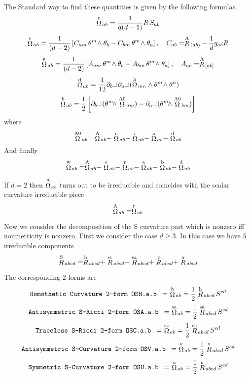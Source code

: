 \documentclass[twoside,openright]{report}
\newcommand{\grgtt}{\ttfamily}
\newcommand{\object}[2]{%
\begin{equation}
\mbox{\comm{#1}} =\ #2
\end{equation}}
\newcommand{\RR}[1]{\stackrel{\rm #1}{R}\!{}}
\newcommand{\OO}[1]{\stackrel{\rm #1}{\Omega}\!{}}
\newcommand{\ipr}{\rule{1.8mm}{.1mm}\rule{.1mm}{2.2mm}\,} %
\renewcommand{\tt}{\grgtt}
\newcommand{\comm}[1]{{\upshape\tt#1}}    %
\begin{document}
The {\tt Standard way} to find these quantities is given
by the following formulas.
\begin{equation}
\OO{r}_{ab} = \frac{1}{d(d-1)}R\,S_{ab}
\end{equation}
\begin{equation}
\OO{c}_{ab} = \frac{1}{(d-2)}\left[
C_{am}\,\theta^m\!\wedge\theta_b
-C_{bm}\,\theta^m\!\wedge\theta_a\right],\quad
C_{ab}=\RR{A}_{(ab)}-\frac{1}{d}g_{ab}R
\end{equation}
\begin{equation}
\OO{a}_{ab} = \frac{1}{(d-2)}\left[
A_{am}\,\theta^m\!\wedge\theta_b
-A_{bm}\,\theta^m\!\wedge\theta_a\right],\quad
A_{ab}=\RR{A}_{[ab]}
\end{equation}
\begin{equation}
\OO{d}_{ab} = \frac{1}{12}\partial_b\ipr\partial_a\ipr
(\OO{A}_{mn}\wedge\theta^m\!\wedge\theta^n)
\end{equation}
\begin{equation}
\OO{b}_{ab} =\frac{1}{2}\left[
\partial_b\ipr(\theta^m\!\wedge\OO{A0}_{am})
-\partial_a\ipr(\theta^m\!\wedge\OO{A0}_{bm})
\right]
\end{equation}
where
\[
\OO{A0}_{ab} =
\OO{A}_{ab}
-\OO{c}_{ab}
-\OO{r}_{ab}
-\OO{a}_{ab}
-\OO{d}_{ab}
\]
And finally
\begin{equation}
\OO{w}_{ab} =
\OO{A}_{ab}
-\OO{c}_{ab}
-\OO{r}_{ab}
-\OO{a}_{ab}
-\OO{b}_{ab}
-\OO{d}_{ab}
\end{equation}

If $d=2$ then $\OO{A}_{ab}$ turns out to be irreducible and
coincides with the scalar curvature irreducible piece
\begin{equation}
\OO{A}_{ab} = \OO{r}_{ab}
\end{equation}

Now we consider the decomposition of the S curvature part which
is nonzero iff nonmetricity is nonzero. First we consider
the case $d\geq3$. In this case we have 5 irreducible components
\begin{equation}
\RR{S}_{abcd} =
\RR{h}_{abcd}+
\RR{sc}_{abcd}+
\RR{sa}_{abcd}+
\RR{v}_{abcd}+
\RR{u}_{abcd}
\end{equation}

The corresponding 2-forms are
\object{Homothetic Curvature 2-form        OSH.a.b }
{\OO{h}_{ab} = \frac12 \RR{h}_{abcd}\,S^{cd}}
\object{Antisymmetric S-Ricci 2-form      OSA.a.b  }
{\OO{sa}_{ab} = \frac12 \RR{sa}_{abcd}\,S^{cd}}
\object{Traceless S-Ricci 2-form          OSC.a.b  }
{\OO{sc}_{ab} = \frac12 \RR{sc}_{abcd}\,S^{cd}}
\object{Antisymmetric S-Curvature 2-form  OSV.a.b  }
{\OO{v}_{ab} = \frac12 \RR{v}_{abcd}\,S^{cd}}
\object{Symmetric S-Curvature 2-form      OSU.a.b  }
{\OO{u}_{ab} = \frac12 \RR{u}_{abcd}\,S^{cd}}
\end{document}
